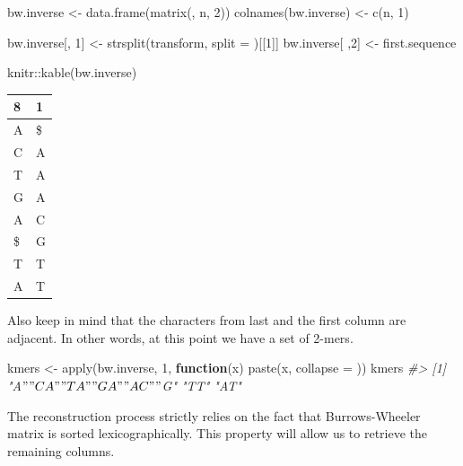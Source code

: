 \documentclass[
]{book}
\newenvironment{Shaded}{\begin{snugshade}}{\end{snugshade}}
\newcommand{\AttributeTok}[1]{\textcolor[rgb]{0.77,0.63,0.00}{#1}}
\newcommand{\CommentTok}[1]{\textcolor[rgb]{0.56,0.35,0.01}{\textit{#1}}}
\newcommand{\ControlFlowTok}[1]{\textcolor[rgb]{0.13,0.29,0.53}{\textbf{#1}}}
\newcommand{\DecValTok}[1]{\textcolor[rgb]{0.00,0.00,0.81}{#1}}
\newcommand{\FunctionTok}[1]{\textcolor[rgb]{0.00,0.00,0.00}{#1}}
\newcommand{\NormalTok}[1]{#1}
\newcommand{\OtherTok}[1]{\textcolor[rgb]{0.56,0.35,0.01}{#1}}
\newcommand{\SpecialCharTok}[1]{\textcolor[rgb]{0.00,0.00,0.00}{#1}}
\newcommand{\StringTok}[1]{\textcolor[rgb]{0.31,0.60,0.02}{#1}}
\begin{document}
\begin{Shaded}
\begin{Highlighting}[numbers=left,,]
\NormalTok{bw.inverse           }\OtherTok{\textless{}{-}} \FunctionTok{data.frame}\NormalTok{(}\FunctionTok{matrix}\NormalTok{(, n, }\DecValTok{2}\NormalTok{))}
\FunctionTok{colnames}\NormalTok{(bw.inverse) }\OtherTok{\textless{}{-}} \FunctionTok{c}\NormalTok{(n, }\DecValTok{1}\NormalTok{)}

\NormalTok{bw.inverse[, }\DecValTok{1}\NormalTok{] }\OtherTok{\textless{}{-}} \FunctionTok{strsplit}\NormalTok{(transform, }\AttributeTok{split =} \StringTok{\textquotesingle{}\textquotesingle{}}\NormalTok{)[[}\DecValTok{1}\NormalTok{]]}
\NormalTok{bw.inverse[ ,}\DecValTok{2}\NormalTok{] }\OtherTok{\textless{}{-}}\NormalTok{ first.sequence}

\NormalTok{knitr}\SpecialCharTok{::}\FunctionTok{kable}\NormalTok{(bw.inverse)}
\end{Highlighting}
\end{Shaded}

\begin{tabular}{l|l}
\hline
8 & 1\\
\hline
A & \$\\
\hline
C & A\\
\hline
T & A\\
\hline
G & A\\
\hline
A & C\\
\hline
\$ & G\\
\hline
T & T\\
\hline
A & T\\
\hline
\end{tabular}

Also keep in mind that the characters from last and the first column are adjacent. In other words, at this point we have a set of 2-mers.

\begin{Shaded}
\begin{Highlighting}[numbers=left,,]
\NormalTok{kmers }\OtherTok{\textless{}{-}} \FunctionTok{apply}\NormalTok{(bw.inverse, }\DecValTok{1}\NormalTok{, }
               \ControlFlowTok{function}\NormalTok{(x) }\FunctionTok{paste}\NormalTok{(x, }\AttributeTok{collapse =} \StringTok{\textquotesingle{}\textquotesingle{}}\NormalTok{))}
\NormalTok{kmers}
\CommentTok{\#\textgreater{} [1] "A$" "CA" "TA" "GA" "AC" "$G" "TT" "AT"}
\end{Highlighting}
\end{Shaded}

The reconstruction process strictly relies on the fact that Burrows-Wheeler matrix is sorted lexicographically. This property will allow us to retrieve the remaining columns.
\end{document}
